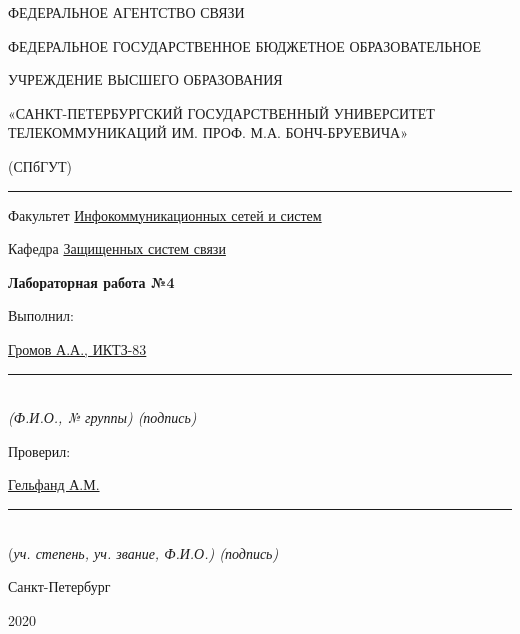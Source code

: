 \documentclass[a4paper,14pt]{extarticle}
\begin{document}
    \begin{center}
        \thispagestyle{empty}
        \begin{singlespace}
        ФЕДЕРАЛЬНОЕ АГЕНТСТВО СВЯЗИ

        ФЕДЕРАЛЬНОЕ ГОСУДАРСТВЕННОЕ БЮДЖЕТНОЕ ОБРАЗОВАТЕЛЬНОЕ

        УЧРЕЖДЕНИЕ ВЫСШЕГО ОБРАЗОВАНИЯ

        «САНКТ-ПЕТЕРБУРГСКИЙ ГОСУДАРСТВЕННЫЙ УНИВЕРСИТЕТ ТЕЛЕКОММУНИКАЦИЙ ИМ. ПРОФ. М.А. БОНЧ-БРУЕВИЧА»

        (СПбГУТ)
        \end{singlespace}
        \vspace{-1ex}
        \rule{\textwidth}{0.4pt}
        \vspace{-5ex}

        Факультет \underline{Инфокоммуникационных сетей и систем}

        Кафедра \underline{Защищенных систем связи}
        \vspace{10ex}

        \textbf{Лабораторная работа №4}

    \end{center}
    \vspace{4ex}
    \begin{flushright}
    \parbox{8cm}{
    \begin{flushleft}
        Выполнил:

        \underline{Громов А.А., ИКТЗ-83} \hfill \rule[-0.85ex]{0.1\textwidth}{0.6pt}\\
        \vspace{-1ex}
        \footnotesize \textit{ (Ф.И.О., № группы) \hfill (подпись)} \normalsize

        Проверил:

        \underline{Гельфанд А.М.} \hfill \rule[-0.85ex]{0.1\textwidth}{0.6pt}\\
        \vspace{-1ex}
        (\footnotesize \textit{уч. степень, уч. звание, Ф.И.О.) \hfill (подпись)} \normalsize

    \end{flushleft}
    }
    \end{flushright}
    \begin{center}
        \vfill
        Санкт-Петербург

        2020

        \end{center}
\end{document}
